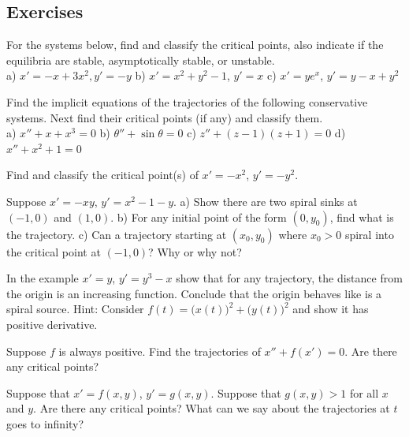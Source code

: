 \documentclass[12pt]{book}
\begin{document}
\subsection{Exercises}

\begin{exercise}
For the systems below, find and classify the critical points, also indicate
if the equilibria are stable, asymptotically stable, or unstable.\\
a) $x'=-x+3x^2, y'=-y$ \qquad
b) $x'=x^2+y^2-1$, $y'=x$ \qquad
c) $x'=ye^x$, $y'=y-x+y^2$
\end{exercise}

\begin{exercise}
Find the implicit equations of the trajectories of the following
conservative systems.  Next find their critical points (if any) and classify them.
\\
a) $x''+ x+x^3 = 0$
\qquad
b) $\theta''+\sin \theta = 0$
\qquad
c) $z''+ (z-1)(z+1) = 0$
\qquad
d) $x''+ x^2+1 = 0$
\end{exercise}

\begin{exercise}
Find and classify the critical point(s) of $x' = -x^2$, $y' = -y^2$.
\end{exercise}

\begin{exercise}
Suppose $x'=-xy$, $y'=x^2-1-y$.  a) Show there are two spiral sinks at
$(-1,0)$ and $(1,0)$.  b)
For any initial point of the form $(0,y_0)$, find what is the trajectory.
c) Can a trajectory starting at $(x_0,y_0)$ where $x_0 > 0$ spiral into 
the critical point at $(-1,0)$?  Why or why not?
\end{exercise}

\begin{exercise} \label{exercise:increasing}
In the example $x'=y$, $y'=y^3-x$ show that for any trajectory, the distance
from the origin is an increasing function.
Conclude
that the origin behaves like is a spiral source.
Hint: Consider $f(t) =
{\bigl(x(t)\bigr)}^2 + 
{\bigl(y(t)\bigr)}^2$ and show it has positive derivative.
\end{exercise}


\begin{exercise}
Suppose $f$ is always positive.
Find the trajectories of $x''+f(x') = 0$.
Are there any critical points?
\end{exercise}

\begin{exercise}
Suppose that $x' = f(x,y)$, $y' = g(x,y)$.  Suppose that $g(x,y) > 1$ for
all $x$ and $y$.  Are there any critical points?  What can we say about the
trajectories at $t$ goes to infinity?
\end{exercise}
\end{document}
